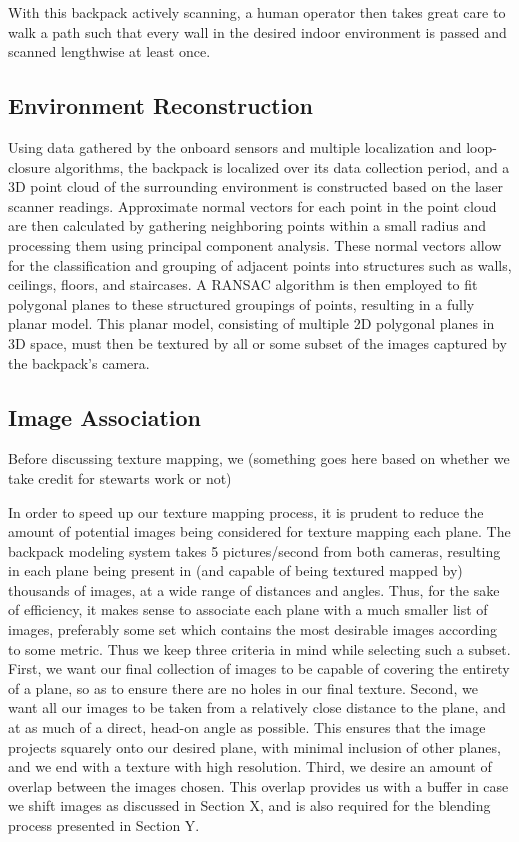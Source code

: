 \documentclass[10pt,twocolumn,letterpaper]{article}
\begin{document}
With this backpack actively scanning, a human operator then takes
great care to walk a path such that every wall in the desired indoor
environment is passed and scanned lengthwise at least once.

\subsection{Environment Reconstruction}
\label{sec:environmentReconstruction}
Using data gathered by the onboard sensors and multiple localization
and loop-closure algorithms, the backpack is localized over its data
collection period, and a 3D point cloud of the surrounding environment
is constructed based on the laser scanner readings. Approximate normal
vectors for each point in the point cloud are then calculated by
gathering neighboring points within a small radius and processing them
using principal component analysis. These normal vectors allow for the
classification and grouping of adjacent points into structures such as
walls, ceilings, floors, and staircases. A RANSAC algorithm is then
employed to fit polygonal planes to these structured groupings of
points, resulting in a fully planar model. This planar model,
consisting of multiple 2D polygonal planes in 3D space, must then be
textured by all or some subset of the images captured by the
backpack's camera.


\subsection{Image Association}
\label{sec:imageAssociation}
Before discussing texture mapping, we (something goes here based on whether we take credit for stewarts work or not)


In order to speed up our texture mapping process, it is prudent to
reduce the amount of potential images being considered for texture
mapping each plane. The backpack modeling system takes 5
pictures/second from both cameras, resulting in each plane being
present in (and capable of being textured mapped by) thousands of
images, at a wide range of distances and angles. Thus, for the sake of
efficiency, it makes sense to associate each plane with a much smaller
list of images, preferably some set which contains the most desirable images
according to some metric. Thus we keep three criteria in mind while
selecting such a subset. First, we want our final collection of images
to be capable of covering the entirety of a plane, so as to ensure
there are no holes in our final texture. Second, we want all our
images to be taken from a relatively close distance to the plane, and
at as much of a direct, head-on angle as possible. This ensures that
the image projects squarely onto our desired plane, with minimal
inclusion of other planes, and we end with a texture with high
resolution. Third, we desire an amount of overlap between the images
chosen. This overlap provides us with a buffer in case we shift images
as discussed in Section X, and is also required for the blending
process presented in Section Y.
\end{document}
